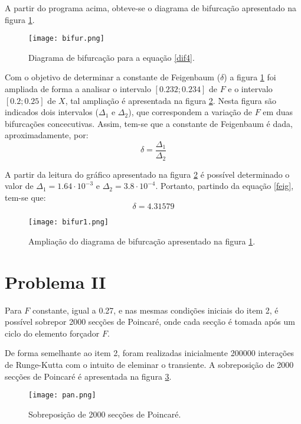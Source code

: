 \documentclass[a4paper,11pt, twoside]{article}
\begin{document}
    {\linespread{1.15}
    }
    \newpage
    A partir do programa acima, obteve-se o diagrama de bifurcação apresentado na figura \ref{bifur}.
    \begin{figure}[!ht]
        \centering
        \texttt{[image: bifur.png]}
        \caption{Diagrama de bifurcação para a equação \eqref{dif4}.\label{bifur}}
    \end{figure}
    
    Com o objetivo de determinar a constante de Feigenbaum ($\delta$) a figura \ref{bifur} foi ampliada
    de forma a analisar o intervalo $[0.232; 0.234]$ de $F$ e o intervalo $[0.2; 0.25]$ de $X$, tal ampliação 
    é apresentada na figura \ref{bifur-amp}. Nesta figura são indicados dois intervalos ($\Delta_1$ e $\Delta_2$),
    que correspondem a variação de $F$ em duas bifurcações concecutivas. Assim, tem-se que a constante de
    Feigenbaum é dada, aproximadamente, por:
    \begin{equation}\label{feig}
        \delta = \frac{\Delta_1}{\Delta_2}
    \end{equation}

    A partir da leitura do gráfico apresentado na figura \ref{bifur-amp} é possível 
    determinado o valor de $\Delta_1 = 1.64\cdot 10^{-3}$ e $\Delta_2 = 3.8\cdot 10^{-4}$.
    Portanto, partindo da equação \eqref{feig}, tem-se que:
    \begin{displaymath}
        \delta = 4.31579
    \end{displaymath}
    \begin{figure}[!ht]
        \centering
        \texttt{[image: bifur1.png]}
        \caption{Ampliação do diagrama de bifurcação apresentado na figura \ref{bifur}.\label{bifur-amp}}
    \end{figure}
    
    \section*{Problema II}
    Para $F$ constante, igual a 0.27, e nas mesmas condições iniciais do item 2,
    é possível sobrepor 2000 secções de Poincaré, onde cada secção é tomada
    após um ciclo do elemento forçador $F$.
    
    De forma semelhante ao item 2, foram realizadas inicialmente 
    200000 interações de Runge-Kutta com o intuito de eleminar o transiente.
    A sobreposição de 2000 secções de Poincaré é apresentada na figura \ref{poin}.
    \newpage
    \begin{figure}[!ht]
        \centering
        \texttt{[image: pan.png]}
        \caption{Sobreposição de 2000 secções de Poincaré.\label{poin}}
    \end{figure}
    
    
\end{document}
